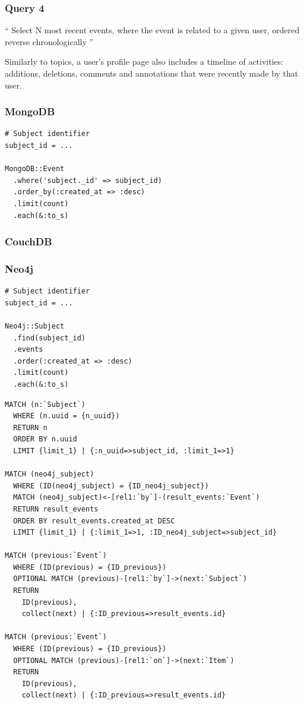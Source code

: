 \subsubsection{Query 4}
\label{subsubsec:query-4}

``
Select N most recent events, where the event is related to a given user, ordered reverse chronologically
''

Similarly to topics, a user's profile page also includes a timeline of  activities: additions, deletions, comments and annotations that were recently made by that user.

\subsubsection*{MongoDB}

\begin{verbatim}
# Subject identifier
subject_id = ...

MongoDB::Event
  .where('subject._id' => subject_id)
  .order_by(:created_at => :desc)
  .limit(count)
  .each(&:to_s)
\end{verbatim}

\subsubsection*{CouchDB}


\subsubsection*{Neo4j}

\begin{verbatim}
# Subject identifier
subject_id = ...

Neo4j::Subject
  .find(subject_id)
  .events
  .order(:created_at => :desc)
  .limit(count)
  .each(&:to_s)
\end{verbatim}

\begin{verbatim}
MATCH (n:`Subject`)
  WHERE (n.uuid = {n_uuid})
  RETURN n
  ORDER BY n.uuid
  LIMIT {limit_1} | {:n_uuid=>subject_id, :limit_1=>1}

MATCH (neo4j_subject)
  WHERE (ID(neo4j_subject) = {ID_neo4j_subject})
  MATCH (neo4j_subject)<-[rel1:`by`]-(result_events:`Event`)
  RETURN result_events
  ORDER BY result_events.created_at DESC
  LIMIT {limit_1} | {:limit_1=>1, :ID_neo4j_subject=>subject_id}

MATCH (previous:`Event`)
  WHERE (ID(previous) = {ID_previous})
  OPTIONAL MATCH (previous)-[rel1:`by`]->(next:`Subject`)
  RETURN
    ID(previous),
    collect(next) | {:ID_previous=>result_events.id}

MATCH (previous:`Event`)
  WHERE (ID(previous) = {ID_previous})
  OPTIONAL MATCH (previous)-[rel1:`on`]->(next:`Item`)
  RETURN
    ID(previous),
    collect(next) | {:ID_previous=>result_events.id}
\end{verbatim}

